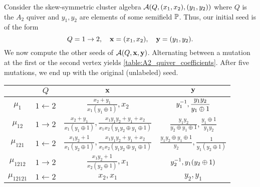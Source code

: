 \begin{example}

	Consider the skew-symmetric cluster algebra $\mathcal{A}(Q, (x_1, x_2), (y_1, y_2))$ where $Q$
	is the $A_2$ quiver and $y_1, y_2$ are elements of some semifield $\mathbb{P}$. Thus, our
	initial seed is of the form
	\begin{equation*}
		Q = 1 \to 2, \quad \mathbf{x} = (x_1, x_2), \quad \mathbf{y} = (y_1, y_2).
	\end{equation*}
	We now compute the other seeds of $\mathcal{A}(Q, \mathbf{x}, \mathbf{y})$. Alternating between a mutation
	at the first or the second vertex yields \cref{table:A2_quiver_coefficients}. After five
	mutations, we end up with the original (unlabeled) seed.
	\begin{table}[ht!]
		\centering
		\bgroup
		\renewcommand{\arraystretch}{2.5}
		\begin{tabular}{c|c|c|c}
			              & $\displaystyle Q$         & $\displaystyle \mathbf{x}$                                                                                                     & $\displaystyle \mathbf{y}$                                                                \\
			\hline
			$\mu_1$       & $\displaystyle 1 \gets 2$ & $\displaystyle \frac{x_2 + y_1}{x_1(y_1 \oplus 1)}, x_2$                                                                & $\displaystyle y_1^{-1}, \frac{y_1y_2}{y_1 \oplus 1}$                               \\[5pt]
			\hline
			$\mu_{12}$    & $\displaystyle 1 \to 2$   & $\displaystyle \frac{x_2 + y_1}{x_1(y_1 \oplus 1)}, \frac{x_1 y_1 y_2 + y_1 + x_2}{x_1x_2(y_1y_2\oplus y_1 \oplus 1)}$  & $\displaystyle \frac{y_1y_2}{y_2\oplus y_1\oplus 1}, \frac{y_1 \oplus 1}{y_1 y_2}$ \\[5pt]
			\hline
			$\mu_{121}$   & $\displaystyle 1 \gets 2$ & $\displaystyle \frac{x_1y_2 + 1}{x_1(y_2 \oplus 1)}, \frac{x_1 y_1 y_2 + y_1 + x_2}{x_1x_2(y_1y_2\oplus y_1 \oplus 1)}$ & $\displaystyle \frac{y_1y_2\oplus y_1\oplus 1}{y_2}, \frac{1}{y_1(y_2 \oplus 1)}$  \\[5pt]
			\hline
			$\mu_{1212}$  & $\displaystyle 1 \to 2$   & $\displaystyle \frac{x_1y_2 + 1}{x_2(y_2 \oplus 1)},x_1$                                                                & $\displaystyle y_2^{-1}, y_1(y_2 \oplus 1)$                                         \\[5pt]
			\hline
			$\mu_{12121}$ & $\displaystyle 1 \gets 2$ & $\displaystyle x_2,x_1$                                                                                                 & $\displaystyle y_2, y_1$
		\end{tabular}
		\egroup


\end{table}
\end{example}
